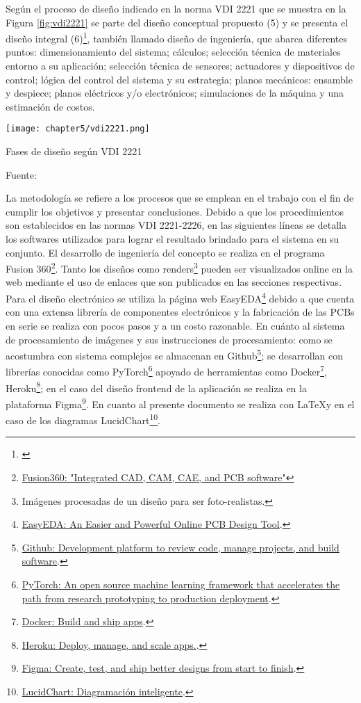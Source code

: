 Según el proceso de diseño indicado en la norma VDI 2221 que se muestra en la Figura \ref{fig:vdi2221} se parte del diseño conceptual propuesto (5) y se presenta el diseño integral (6)\footnote{\cite{Pahl2007}}, también llamado diseño de ingeniería, que abarca diferentes puntos: dimensionamiento del sistema; cálculos; selección técnica de materiales entorno a su aplicación; selección técnica de sensores; actuadores y dispositivos de control; lógica del control del sistema y su estrategia; planos mecánicos: ensamble y despiece; planos eléctricos y/o electrónicos; simulaciones de la máquina y una estimación de costos.

\begin{myfigure}[H]
	\footnotesize\centering
	\texttt{[image: chapter5/vdi2221.png]}
	\caption{Fases de diseño según VDI 2221}
	\begin{myflushcenter}
		Fuente: \cite{Pahl2007}
	\end{myflushcenter}
	\label{fig:vdi2221}
\end{myfigure}

La metodología se refiere a los procesos que se emplean en el trabajo con el fin de cumplir los objetivos y presentar conclusiones. Debido a que los procedimientos son establecidos en las normas VDI 2221-2226, en las siguientes líneas se detalla los softwares utilizados para lograr el resultado brindado para el sistema en su conjunto. El desarrollo de ingeniería del concepto se realiza en el programa Fusion 360\footnote{\href{https://www.autodesk.com/products/fusion-360/overview}{Fusion360: "Integrated CAD, CAM, CAE, and PCB software"}}. Tanto los diseños como renders\footnote{Imágenes procesadas de un diseño para ser foto-realistas.} pueden ser visualizados online en la web mediante el uso de enlaces que son publicados en las secciones respectivas. Para el diseño electrónico se utiliza la página web EasyEDA\footnote{\href{https://easyeda.com/}{EasyEDA: An Easier and Powerful Online PCB Design Tool}.} debido a que cuenta con una extensa librería de componentes electrónicos y la fabricación de las PCBs en serie se realiza con pocos pasos y a un costo razonable. En cuánto al sistema de procesamiento de imágenes y sus instrucciones de procesamiento: como se acostumbra con sistema complejos se almacenan en Github\footnote{\href{https://github.com/}{Github: Development platform to review code, manage projects, and build software}.}; se desarrollan con librerías conocidas como PyTorch\footnote{\href{https://pytorch.org/}{PyTorch: An open source machine learning framework that accelerates the path from research prototyping to production deployment}.} apoyado de herramientas como Docker\footnote{\href{https://www.docker.com/}{Docker: Build and ship apps}.}, Heroku\footnote{\href{https://www.heroku.com/}{Heroku: Deploy, manage, and scale apps.}.}; en el caso del diseño frontend de la aplicación se realiza en la plataforma Figma\footnote{\href{https://www.figma.com/}{Figma: Create, test, and ship better designs from start to finish}.}. En cuanto al presente documento se realiza con \LaTeX y en el caso de los diagramas LucidChart\footnote{\href{https://www.lucidchart.com/}{LucidChart: Diagramación inteligente}.}.




